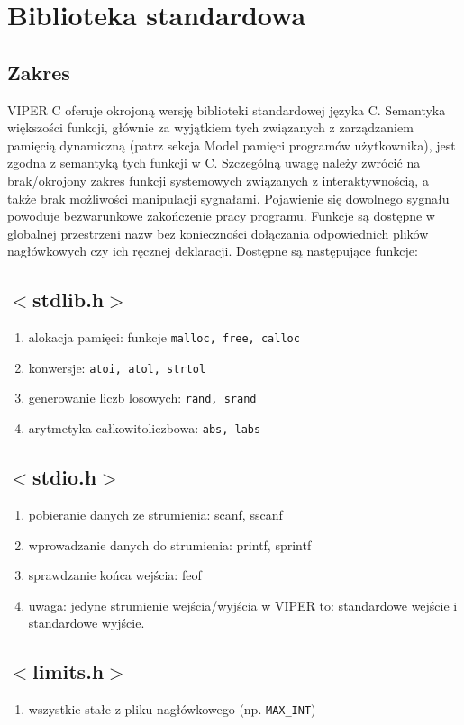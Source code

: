 \documentclass[a4paper,twoside,openright,11pt]{report}
\begin{document}
  \section {Biblioteka standardowa}
  \subsection {Zakres}
  \par VIPER C oferuje okrojoną wersję biblioteki standardowej języka C. Semantyka większości funkcji, głównie za wyjątkiem tych związanych z zarządzaniem pamięcią dynamiczną (patrz sekcja Model pamięci programów użytkownika), jest zgodna z semantyką tych funkcji w C. Szczególną uwagę należy zwrócić na brak/okrojony zakres funkcji systemowych związanych z interaktywnością, a także brak możliwości manipulacji sygnałami. Pojawienie się dowolnego sygnału powoduje bezwarunkowe zakończenie pracy programu. Funkcje są dostępne w globalnej przestrzeni nazw bez konieczności dołączania odpowiednich plików nagłówkowych czy ich ręcznej deklaracji. Dostępne są następujące funkcje:

  \subsection {$<$stdlib.h$>$}
    \begin{enumerate}
      \item alokacja pamięci: funkcje \texttt{malloc, free, calloc}
      \item konwersje: \texttt{atoi, atol, strtol}
      \item generowanie liczb losowych: \texttt{rand, srand}
      \item arytmetyka całkowitoliczbowa: \texttt{abs, labs}
    \end{enumerate}
  \subsection {$<$stdio.h$>$}
    \begin{enumerate}
      \item pobieranie danych ze strumienia: scanf, sscanf
      \item wprowadzanie danych do strumienia: printf, sprintf
      \item sprawdzanie końca wejścia: feof
      \item uwaga: jedyne strumienie wejścia/wyjścia w VIPER to: standardowe wejście i standardowe wyjście.
    \end{enumerate}
  \subsection {$<$limits.h$>$}
    \begin{enumerate}
      \item wszystkie stałe z pliku nagłówkowego (np. \texttt{MAX\_INT})
    \end{enumerate}
\end{document}
